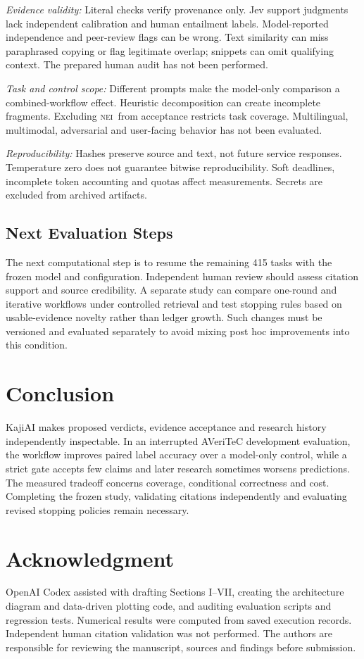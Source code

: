 \documentclass[conference]{IEEEtran}
\newcommand{\NEI}{\textsc{nei}}
\begin{document}
\textit{Evidence validity:} Literal checks verify provenance only. Jev support judgments lack independent calibration and human entailment labels. Model-reported independence and peer-review flags can be wrong. Text similarity can miss paraphrased copying or flag legitimate overlap; snippets can omit qualifying context. The prepared human audit has not been performed.

\textit{Task and control scope:} Different prompts make the model-only comparison a combined-workflow effect. Heuristic decomposition can create incomplete fragments. Excluding \NEI\ from acceptance restricts task coverage. Multilingual, multimodal, adversarial and user-facing behavior has not been evaluated.

\textit{Reproducibility:} Hashes preserve source and text, not future service responses. Temperature zero does not guarantee bitwise reproducibility. Soft deadlines, incomplete token accounting and quotas affect measurements. Secrets are excluded from archived artifacts.

\subsection{Next Evaluation Steps}
The next computational step is to resume the remaining 415 tasks with the frozen model and configuration. Independent human review should assess citation support and source credibility. A separate study can compare one-round and iterative workflows under controlled retrieval and test stopping rules based on usable-evidence novelty rather than ledger growth. Such changes must be versioned and evaluated separately to avoid mixing post hoc improvements into this condition.

\section{Conclusion}
KajiAI makes proposed verdicts, evidence acceptance and research history independently inspectable. In an interrupted AVeriTeC development evaluation, the workflow improves paired label accuracy over a model-only control, while a strict gate accepts few claims and later research sometimes worsens predictions. The measured tradeoff concerns coverage, conditional correctness and cost. Completing the frozen study, validating citations independently and evaluating revised stopping policies remain necessary.

\section*{Acknowledgment}
OpenAI Codex assisted with drafting Sections I--VII, creating the architecture diagram and data-driven plotting code, and auditing evaluation scripts and regression tests. Numerical results were computed from saved execution records. Independent human citation validation was not performed. The authors are responsible for reviewing the manuscript, sources and findings before submission.
\end{document}
